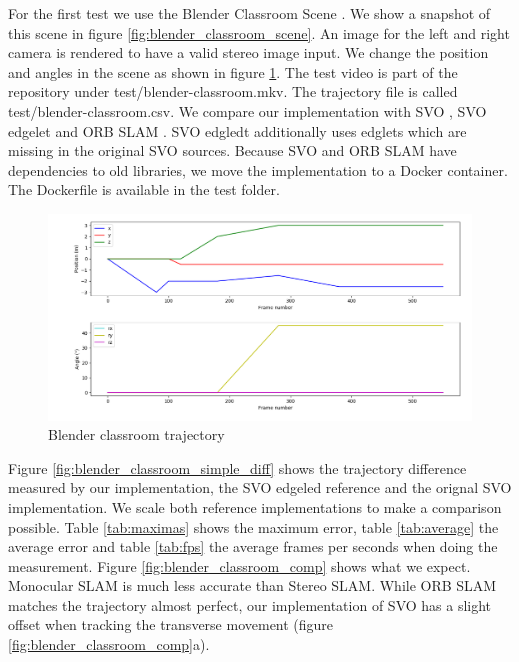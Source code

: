 \documentclass[11pt,a4paper,titlepage,oneside]{report}
\begin{document}
For the first test we use the Blender Classroom Scene \cite{blender}. We show a snapshot of this scene in figure \ref{fig:blender_classroom_scene}. An image for the left and right camera is rendered to have a valid stereo image input. We change the position and angles in the scene as shown in figure \ref{fig:blender_classroom_simple_traj}. The test video is part of the repository under test/blender-classroom.mkv. The trajectory file is called test/blender-classroom.csv. We compare our implementation with SVO \cite{svo}, SVO edgelet \cite{svo_edglet} and ORB SLAM \cite{orbslam}. SVO edgledt additionally uses edglets which are missing in the original SVO sources. Because SVO and ORB SLAM have dependencies to old libraries, we move the implementation to a Docker container. The Dockerfile is available in the test folder.

\begin{figure}[H]
  \centering
  \includegraphics[width=1.0\textwidth]{img/blender_classroom_simple_traj.png}
  \caption{Blender classroom trajectory}\label{fig:blender_classroom_simple_traj}
\end{figure}

Figure \ref{fig:blender_classroom_simple_diff} shows the trajectory difference measured by our implementation, the SVO edgeled reference and the orignal SVO implementation. We scale both reference implementations to make a comparison possible. Table \ref{tab:maximas} shows the maximum error, table \ref{tab:average} the average error and table \ref{tab:fps} the average frames per seconds when doing the measurement. Figure \ref{fig:blender_classroom_comp} shows what we expect. Monocular SLAM is much less accurate than Stereo SLAM. While ORB SLAM matches the trajectory almost perfect, our implementation of SVO has a slight offset when tracking the transverse movement (figure \ref{fig:blender_classroom_comp}a).
\end{document}
